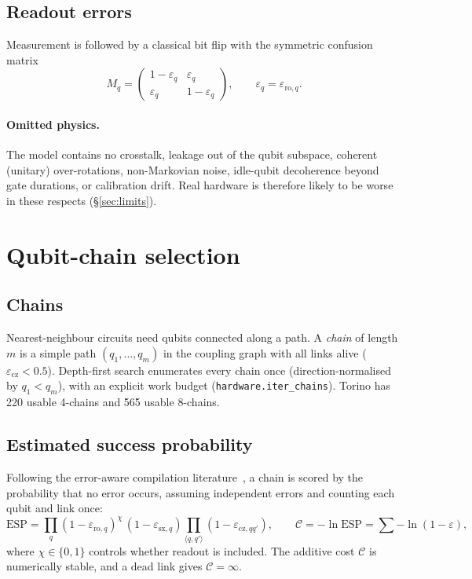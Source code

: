 \documentclass[10pt,a4paper]{article}
\newcommand{\code}[1]{\texttt{\small #1}}
\begin{document}
\subsection{Readout errors}
Measurement is followed by a classical bit flip with the symmetric confusion matrix
\begin{equation}
M_q=\begin{pmatrix}1-\varepsilon_q & \varepsilon_q\\ \varepsilon_q & 1-\varepsilon_q\end{pmatrix},\qquad \varepsilon_q=\varepsilon_{\mathrm{ro},q}.
\end{equation}

\paragraph{Omitted physics.} The model contains no crosstalk, leakage out of the qubit subspace, coherent (unitary) over-rotations, non-Markovian noise, idle-qubit decoherence beyond gate durations, or calibration drift. Real hardware is therefore likely to be worse in these respects (\S\ref{sec:limits}).

\section{Qubit-chain selection}\label{sec:chain}
\subsection{Chains}
Nearest-neighbour circuits need qubits connected along a path. A \emph{chain} of length $m$ is a simple path $(q_1,\dots,q_m)$ in the coupling graph with all links alive ($\varepsilon_{\mathrm{cz}}<0.5$). Depth-first search enumerates every chain once (direction-normalised by $q_1<q_m$), with an explicit work budget (\code{hardware.iter\_chains}). Torino has 220 usable 4-chains and 565 usable 8-chains.

\subsection{Estimated success probability}
Following the error-aware compilation literature~\cite{Nishio2020,Murali2019}, a chain is scored by the probability that no error occurs, assuming independent errors and counting each qubit and link once:
\begin{equation}
\mathrm{ESP}=\prod_{q}(1-\varepsilon_{\mathrm{ro},q})^{\chi}\,(1-\varepsilon_{\mathrm{sx},q})\prod_{\langle q,q'\rangle}(1-\varepsilon_{\mathrm{cz},qq'}),\qquad
\mathcal C=-\ln\mathrm{ESP}=\sum -\ln(1-\varepsilon),
\end{equation}
where $\chi\in\{0,1\}$ controls whether readout is included. The additive cost $\mathcal C$ is numerically stable, and a dead link gives $\mathcal C=\infty$.
\end{document}
